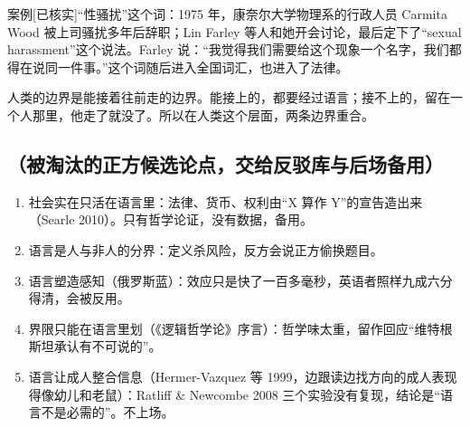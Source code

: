 \documentclass[prep,both]{debate}
\begin{document}
\begin{fields}
\begin{evidence}{案例}[已核实]“性骚扰”这个词：1975 年，康奈尔大学物理系的行政人员 Carmita Wood 被上司骚扰多年后辞职；Lin Farley 等人和她开会讨论，最后定下了“sexual harassment”这个说法。Farley 说：“我觉得我们需要给这个现象一个名字，我们都得在说同一件事。”这个词随后进入全国词汇，也进入了法律。\end{evidence}
\closing{人类的边界是能接着往前走的边界。能接上的，都要经过语言；接不上的，留在一个人那里，他走了就没了。所以在人类这个层面，两条边界重合。}
\begin{clash}\end{clash}
\end{fields}

\subsection{（被淘汰的正方候选论点，交给反驳库与后场备用）}
\begin{enumerate}[leftmargin=1.8em]
\item 社会实在只活在语言里：法律、货币、权利由“X 算作 Y”的宣告造出来（Searle 2010）。只有哲学论证，没有数据，备用。
\item 语言是人与非人的分界：定义杀风险，反方会说正方偷换题目。
\item 语言塑造感知（俄罗斯蓝）：效应只是快了一百多毫秒，英语者照样九成六分得清，会被反用。
\item 界限只能在语言里划（《逻辑哲学论》序言）：哲学味太重，留作回应“维特根斯坦承认有不可说的”。
\item 语言让成人整合信息（Hermer-Vazquez 等 1999，边跟读边找方向的成人表现得像幼儿和老鼠）：Ratliff \& Newcombe 2008 三个实验没有复现，结论是“语言不是必需的”。不上场。
\end{enumerate}
\end{document}
